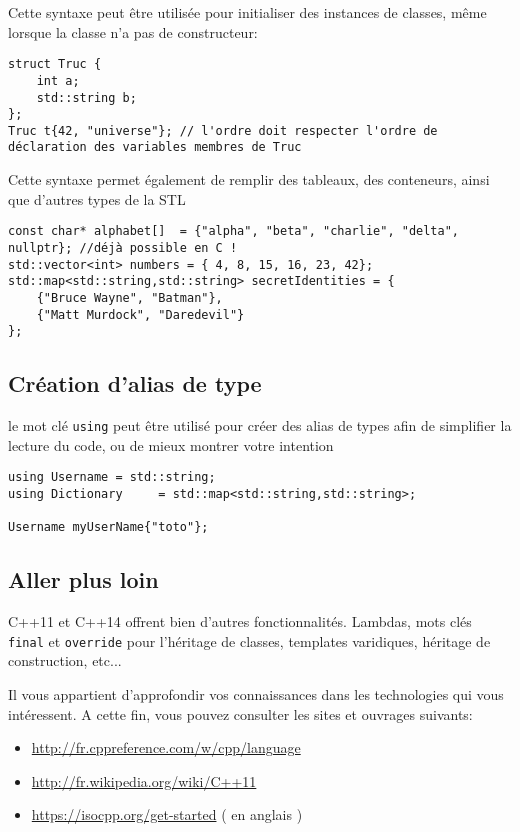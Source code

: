 \documentclass[9pt]{article}
\begin{document}
Cette syntaxe peut être utilisée pour initialiser des instances de classes, même lorsque la classe n'a pas de constructeur:

\begin{lstlisting}
struct Truc {
	int a;
	std::string b;
};
Truc t{42, "universe"}; // l'ordre doit respecter l'ordre de déclaration des variables membres de Truc
\end{lstlisting}

Cette syntaxe permet également de remplir des tableaux, des conteneurs, ainsi que d'autres types de la STL

\begin{lstlisting}
const char* alphabet[]  = {"alpha", "beta", "charlie", "delta", nullptr}; //déjà possible en C !
std::vector<int> numbers = { 4, 8, 15, 16, 23, 42};
std::map<std::string,std::string> secretIdentities = { 
	{"Bruce Wayne", "Batman"}, 
	{"Matt Murdock", "Daredevil"}
};
\end{lstlisting}

\subsection*{Création d'alias de type}

le mot clé \lstinline{using} peut être utilisé pour créer des alias de types afin de simplifier la lecture du code, ou de mieux montrer votre intention

\begin{lstlisting}
using Username = std::string;
using Dictionary     = std::map<std::string,std::string>;

Username myUserName{"toto"};
\end{lstlisting}

\subsection*{Aller plus loin}

C++11 et C++14 offrent bien d'autres fonctionnalités. Lambdas, mots clés \lstinline{final} et \lstinline{override} pour l'héritage de classes, templates varidiques, héritage de construction, etc...

Il vous appartient d'approfondir vos connaissances dans les technologies qui vous intéressent.
A cette fin, vous pouvez consulter les sites et ouvrages suivants:

\begin{itemize}
\item \url{http://fr.cppreference.com/w/cpp/language}
\item \url{http://fr.wikipedia.org/wiki/C++11}
\item \url{https://isocpp.org/get-started} ( en anglais )
\end{itemize}

\makeatletter
\renewcommand\@biblabel[1]{}
\makeatother


\nocite{*}

\end{document}
